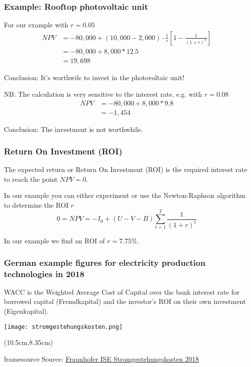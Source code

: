 \documentclass[10pt,aspectratio=169,dvipsnames]{beamer}
\newcommand{\source}[1]{\begin{textblock*}{5cm}(10.5cm,8.35cm)
    \begin{beamercolorbox}[ht=0.5cm,right]{framesource}
        \usebeamerfont{framesource}\usebeamercolor[fg]{framesource} Source: {#1}
    \end{beamercolorbox}
\end{textblock*}}
\begin{document}
\begin{frame}
  \frametitle{Example: Rooftop photovoltaic unit}

  For our example with $r= 0.05$
  \begin{align*}
    NPV & = -80,000 + (10,000 - 2,000)  \cdot \frac{1}{r} \left[1  - \frac{1}{(1+r)^{T}}  \right] \\
    & = -80,000 + 8,000*12.5 \\
    & = 19,698
  \end{align*}

  \alert{Conclusion:} It's worthwile to invest in the photovoltaic unit!

  \pause

  NB: The calculation is very sensitive to the interest rate, e.g. with $r = 0.08$
  \begin{align*}
    NPV & = -80,000 + 8,000*9.8 \\
    & = -1,454
  \end{align*}

  \alert{Conclusion:} The investment is not worthwhile.

\end{frame}

\begin{frame}
  \frametitle{Return On Investment (ROI)}

  The expected return or \alert{Return On Investment (ROI)} is the required interest rate to reach the point $NPV = 0$.

  In our example you can either experiment or use the Newton-Raphson algorithm to determine the ROI $r$
  \begin{equation*}
    0 = NPV = -I_0 + (U - V - B) \sum_{t=1}^T \frac{1}{(1+r)^t}
  \end{equation*}

  In our example we find an ROI of $r=7.75$\%.

\end{frame}



\begin{frame}
  \frametitle{German example figures for electricity production technologies in 2018}

  WACC is the \alert{Weighted Average Cost of Capital} over the bank interest rate for borrowed capital (Fremdkapital) and the investor's ROI on their own investment (Eigenkapital).

  \centering
  \texttt{[image: stromgestehungskosten.png]}


  \source{\href{https://www.ise.fraunhofer.de/content/dam/ise/de/documents/publications/studies/DE2018_ISE_Studie_Stromgestehungskosten_Erneuerbare_Energien.pdf}{Fraunhofer ISE Stromgestehungskosten 2018}}

\end{frame}
\end{document}
